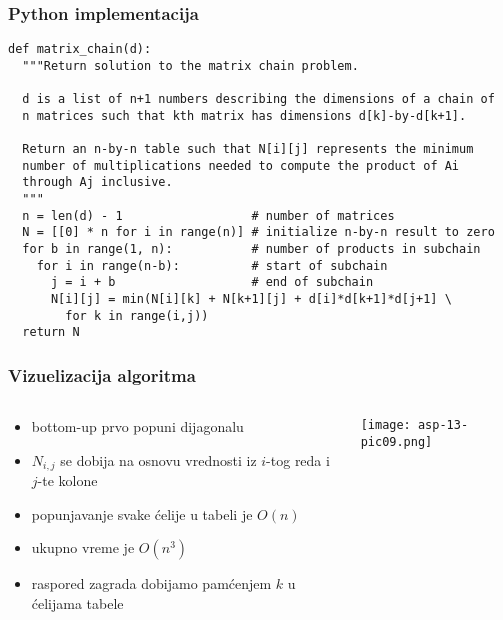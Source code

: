 \documentclass[compress,aspectratio=169]{beamer}
\begin{document}
\begin{frame}[fragile,shrink=15]
  \frametitle{Python implementacija}
\begin{verbatim}
def matrix_chain(d):
  """Return solution to the matrix chain problem.

  d is a list of n+1 numbers describing the dimensions of a chain of
  n matrices such that kth matrix has dimensions d[k]-by-d[k+1].
 
  Return an n-by-n table such that N[i][j] represents the minimum 
  number of multiplications needed to compute the product of Ai 
  through Aj inclusive.
  """
  n = len(d) - 1                  # number of matrices
  N = [[0] * n for i in range(n)] # initialize n-by-n result to zero
  for b in range(1, n):           # number of products in subchain
    for i in range(n-b):          # start of subchain
      j = i + b                   # end of subchain
      N[i][j] = min(N[i][k] + N[k+1][j] + d[i]*d[k+1]*d[j+1] \
        for k in range(i,j))
  return N
\end{verbatim}
\end{frame}

\begin{frame}
  \frametitle{Vizuelizacija algoritma}
  \begin{columns}
    \begin{column}[t]{6cm}
      \begin{itemize}
        \item bottom-up prvo popuni dijagonalu
        \item $N_{i,j}$ se dobija na osnovu vrednosti iz $i$-tog reda i 
        $j$-te kolone
        \item popunjavanje svake ćelije u tabeli je $O(n)$
        \item ukupno vreme je $O(n^3)$
        \item raspored zagrada dobijamo pamćenjem $k$ u ćelijama tabele
      \end{itemize}
    \end{column}
    \begin{column}[t]{6cm}
      \begin{center}
        \texttt{[image: asp-13-pic09.png]}
      \end{center}
    \end{column}
  \end{columns}
\end{frame}
\end{document}
